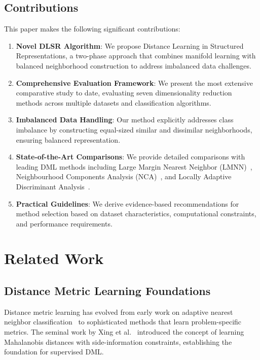 \documentclass[review]{elsarticle}
\begin{document}
\subsection{Contributions}

This paper makes the following significant contributions:

\begin{enumerate}
\item \textbf{Novel DLSR Algorithm}: We propose Distance Learning in Structured Representations, a two-phase approach that combines manifold learning with balanced neighborhood construction to address imbalanced data challenges.

\item \textbf{Comprehensive Evaluation Framework}: We present the most extensive comparative study to date, evaluating seven dimensionality reduction methods across multiple datasets and classification algorithms.

\item \textbf{Imbalanced Data Handling}: Our method explicitly addresses class imbalance by constructing equal-sized similar and dissimilar neighborhoods, ensuring balanced representation.

\item \textbf{State-of-the-Art Comparisons}: We provide detailed comparisons with leading DML methods including Large Margin Nearest Neighbor (LMNN)~\cite{weinberger2009distance}, Neighbourhood Components Analysis (NCA)~\cite{goldberger2005neighbourhood}, and Locally Adaptive Discriminant Analysis~\cite{hastie1996discriminant}.

\item \textbf{Practical Guidelines}: We derive evidence-based recommendations for method selection based on dataset characteristics, computational constraints, and performance requirements.
\end{enumerate}

\section{Related Work}
\label{sec:related}

\subsection{Distance Metric Learning Foundations}

Distance metric learning has evolved from early work on adaptive nearest neighbor classification~\cite{cover1967nearest} to sophisticated methods that learn problem-specific metrics. The seminal work by Xing et al.~\cite{xing2002distance} introduced the concept of learning Mahalanobis distances with side-information constraints, establishing the foundation for supervised DML.
\end{document}
